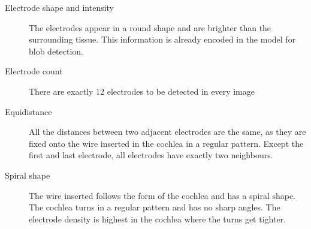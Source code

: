 \documentclass[a4paper, 10pt, twocolumn]{article}
\begin{document}
\begin{description} %
\item[Electrode shape and intensity] The electrodes appear in a round shape and are brighter than the surrounding tissue. This information is already encoded in the model for blob detection.
\item[Electrode count] There are exactly 12 electrodes to be detected in every image
\item[Equidistance] All the distances between two adjacent electrodes are the same, as they are fixed onto the wire inserted in the cochlea in a regular pattern. Except the first and last electrode, all electrodes have exactly two neighbours. 
\item[Spiral shape] The wire inserted follows the form of the cochlea and has a spiral shape. The cochlea turns in a regular pattern and has no sharp angles. The electrode density is highest in the cochlea where the turns get tighter.
\end{description}
\end{document}
